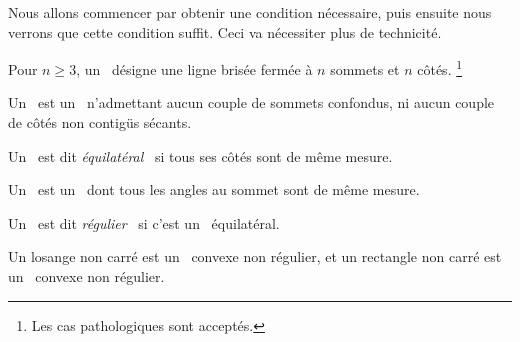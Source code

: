 Nous allons commencer par obtenir une condition nécessaire, puis ensuite nous verrons que cette condition suffit.
Ceci va nécessiter plus de technicité.




\begin{defi}
	Pour $n \geq 3$, un \og \emph{\ncycle} \fg\ désigne une ligne brisée fermée à $n$ sommets et $n$ côtés.%
	\footnote{
		Les cas pathologiques sont acceptés.
	}
\end{defi}


\begin{defi}
	Un \og \emph{\ngone} \fg\ est un \ncycle\ n'admettant aucun couple de sommets confondus, ni aucun couple de côtés non contigüs sécants.
\end{defi}


\begin{defi}
	Un \ngone\ est dit \og \emph{équilatéral} \fg\ si tous ses côtés sont de même mesure.
\end{defi}


\begin{defi}
	Un \og \emph{\niso} \fg\ est un \ngone\ dont tous les angles au sommet sont de même mesure.
\end{defi}


\begin{defi}
	Un \ngone\ est dit \og \emph{régulier} \fg\ si c'est un \niso\ équilatéral.
\end{defi}


\begin{remark}
	Un losange non carré est un \nequi\ convexe non régulier, et un rectangle non carré est un \niso\ convexe non régulier.
\end{remark}
